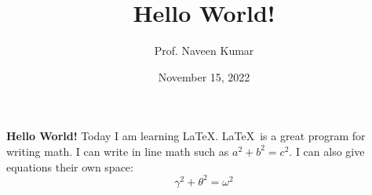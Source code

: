 \documentclass{article}
\title{Hello World!}
\author{Prof. Naveen Kumar}
\date{November 15, 2022}
\begin{document}
\maketitle

\textbf{Hello World!} Today I am learning \LaTeX. \LaTeX\ is a great program for writing math. I can write in line math such as \( a^2 + b^2 = c^2 \). I can also give equations their own space:
\[
\gamma^2 + \theta^2 = \omega^2
\]
\end{document}
